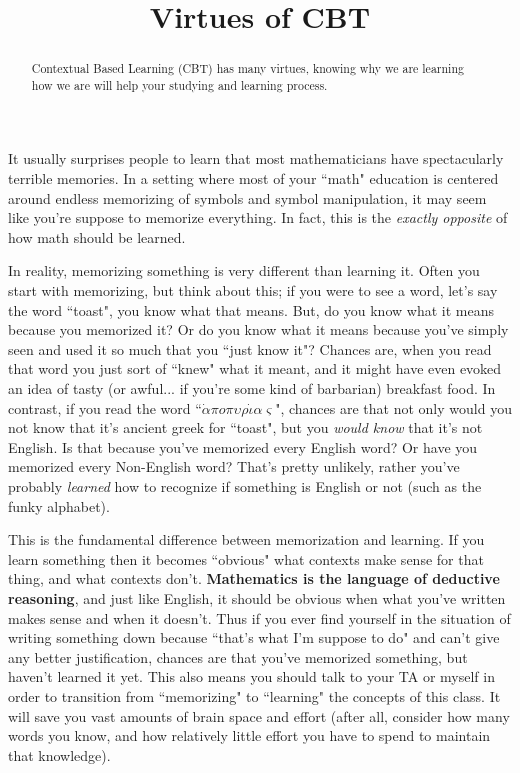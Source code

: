 \documentclass{ximeraXloud}
\title{Virtues of CBT}
\begin{document}
\begin{abstract}
Contextual Based Learning (CBT) has many virtues, knowing why we are learning how we are will help your studying and learning process.
\end{abstract}
\maketitle

It usually surprises people to learn that most mathematicians have spectacularly terrible memories. In a setting where most of your ``math" education is centered around endless memorizing of symbols and symbol manipulation, it may seem like you're suppose to memorize everything. In fact, this is the \textit{exactly opposite} of how math should be learned.

In reality, memorizing something is very different than learning it. Often you start with memorizing, but think about this; if you were to see a word, let's say the word ``toast", you know what that means. But, do you know what it means because you memorized it? Or do you know what it means because you've simply seen and used it so much that you ``just know it"? Chances are, when you read that word you just sort of ``knew" what it meant, and it might have even evoked an idea of tasty (or awful... if you're some kind of barbarian) breakfast food. In contrast, if you read the word ``$\dot{\alpha}\pi o \pi\upsilon\rho\dot{\iota}\alpha\varsigma$", chances are that not only would you not know that it's ancient greek for ``toast", but you \textit{would know} that it's not English. Is that because you've memorized every English word? Or have you memorized every Non-English word? That's pretty unlikely, rather you've probably \textit{learned} how to recognize if something is English or not (such as the funky alphabet).

This is the fundamental difference between memorization and learning. If you learn something then it becomes ``obvious" what contexts make sense for that thing, and what contexts don't. \textbf{Mathematics is the language of deductive reasoning}, and just like English, it should be obvious when what you've written makes sense and when it doesn't. Thus if you ever find yourself in the situation of writing something down because ``that's what I'm suppose to do" and can't give any better justification, chances are that you've memorized something, but haven't learned it yet. This also means you should talk to your TA or myself in order to transition from ``memorizing" to ``learning" the concepts of this class. It will save you vast amounts of brain space and effort (after all, consider how many words you know, and how relatively little effort you have to spend to maintain that knowledge).
\end{document}
